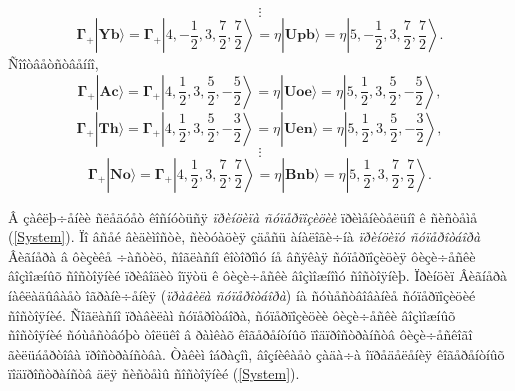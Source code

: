 \[
\vdots
\]
\[
\boldsymbol{\Gamma}_+|\textbf{Yb}\rangle=\boldsymbol{\Gamma}_+\left|4,-\frac{1}{2},3,\frac{7}{2},\frac{7}{2}\right\rangle=
\eta|\textbf{Upb}\rangle=\eta\left|5,-\frac{1}{2},3,\frac{7}{2},\frac{7}{2}\right\rangle.
\]
Ñîîòâåòñòâåííî,
\[
\boldsymbol{\Gamma}_+|\textbf{Ac}\rangle=\boldsymbol{\Gamma}_+\left|4,\frac{1}{2},3,\frac{5}{2},-\frac{5}{2}\right\rangle=
\eta|\textbf{Uoe}\rangle=\eta\left|5,\frac{1}{2},3,\frac{5}{2},-\frac{5}{2}\right\rangle,
\]
\[
\boldsymbol{\Gamma}_+|\textbf{Th}\rangle=\boldsymbol{\Gamma}_+\left|4,\frac{1}{2},3,\frac{5}{2},-\frac{3}{2}\right\rangle=
\eta|\textbf{Uen}\rangle=\eta\left|5,\frac{1}{2},3,\frac{5}{2},-\frac{3}{2}\right\rangle,
\]
\[
\vdots
\]
\[
\boldsymbol{\Gamma}_+|\textbf{No}\rangle=\boldsymbol{\Gamma}_+\left|4,\frac{1}{2},3,\frac{7}{2},\frac{7}{2}\right\rangle=
\eta|\textbf{Bnb}\rangle=\eta\left|5,\frac{1}{2},3,\frac{7}{2},\frac{7}{2}\right\rangle.
\]

Â çàêëþ÷åíèè ñëåäóåò êîñíóòüñÿ \textit{ïðèíöèïà ñóïåðïîçèöèè} ïðèìåíèòåëüíî ê ñèñòåìå (\ref{System}). Ïî âñåé âèäèìîñòè, ñèòóàöèÿ çäåñü àíàëîãè÷íà \textit{ïðèíöèïó ñóïåðîòáîðà} Âèãíåðà \cite{WWW52} â ôèçèêå ÷àñòèö, ñîãëàñíî êîòîðîìó íå âñÿêàÿ ñóïåðïîçèöèÿ ôèçè÷åñêè âîçìîæíûõ ñîñòîÿíèé ïðèâîäèò îïÿòü ê ôèçè÷åñêè âîçìîæíîìó ñîñòîÿíèþ. Ïðèíöèï Âèãíåðà íàêëàäûâàåò îãðàíè÷åíèÿ (\textit{ïðàâèëà ñóïåðîòáîðà}) íà ñóùåñòâîâàíèå ñóïåðïîçèöèé ñîñòîÿíèé. Ñîãëàñíî ïðàâèëàì ñóïåðîòáîðà, ñóïåðïîçèöèè ôèçè÷åñêè âîçìîæíûõ ñîñòîÿíèé ñóùåñòâóþò òîëüêî â ðàìêàõ êîãåðåíòíûõ ïîäïðîñòðàíñòâ ôèçè÷åñêîãî ãèëüáåðòîâà ïðîñòðàíñòâà. Òàêèì îáðàçîì, âîçíèêàåò çàäà÷à îïðåäåëåíèÿ êîãåðåíòíûõ ïîäïðîñòðàíñòâ äëÿ ñèñòåìû ñîñòîÿíèé (\ref{System}).

